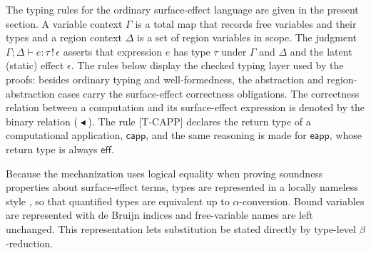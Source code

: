 \documentclass[10pt,a4paper]{article}
\newcommand{\desc}{\mathrel{\blacktriangleleft}}      %
\begin{document}
The typing rules for the ordinary surface-effect language are given in the
present section. A variable context $\Gamma$ is a total map that records free
variables and their types and a region context $\Delta$ is a set of region
variables in scope. The judgment
$\Gamma; \Delta \vdash e : \tau\,!\,\epsilon$ asserts that expression $e$ has
type $\tau$ under $\Gamma$ and $\Delta$ and the latent (static) effect
$\epsilon$. The rules below display the checked typing layer used by the
proofs: besides ordinary typing and well-formedness, the abstraction and
region-abstraction cases carry the surface-effect correctness obligations. The
correctness relation between a computation and its surface-effect expression is
denoted by the binary relation ($\desc$). The rule [T-CAPP] declares the
return type of a computational application, $\mathsf{capp}$, and the same
reasoning is made for $\mathsf{eapp}$, whose return type is always
$\mathsf{eff}$.

Because the mechanization uses logical equality when proving soundness
properties about surface-effect terms, types are represented in a locally nameless
style \citep{chargueraud2012}, so that quantified types are equivalent up to
$\alpha$-conversion. Bound variables are represented with de Bruijn indices
and free-variable names are left unchanged. This representation lets
substitution be stated directly by type-level $\beta$-reduction.
\end{document}
